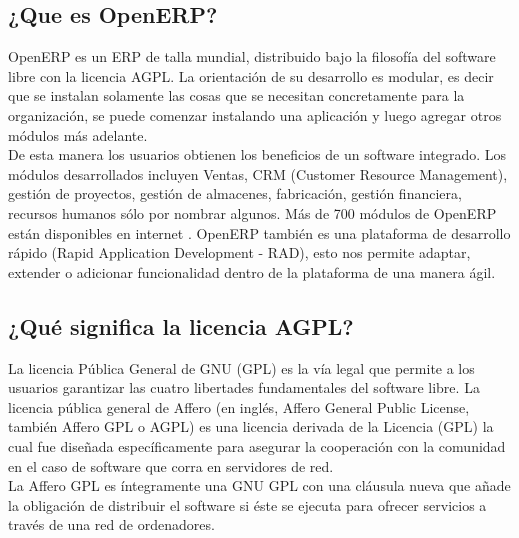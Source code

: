 \subsection{¿Que es OpenERP?}
OpenERP es un ERP de talla mundial, distribuido bajo la filosofía del software libre con la licencia AGPL.
La orientación de su desarrollo es modular, es decir que 
se instalan solamente las cosas que se necesitan concretamente para la organización, se puede comenzar instalando una aplicación y luego 
agregar otros módulos más adelante.\\
De esta manera los usuarios obtienen los beneficios de un software integrado. Los módulos desarrollados incluyen Ventas,
CRM (Customer Resource Management), gestión de proyectos, gestión de almacenes, fabricación, gestión financiera, recursos humanos sólo por nombrar algunos. 
Más de 700 módulos de OpenERP están disponibles en internet \cite{OpenERP}.
OpenERP también es una plataforma de desarrollo rápido (Rapid Application Development - RAD), esto nos permite adaptar, extender o adicionar funcionalidad dentro de la plataforma de una manera ágil.

\subsection{¿Qué significa la licencia AGPL?}
La licencia  Pública General de GNU (GPL) es la vía legal que permite a los usuarios garantizar las cuatro libertades fundamentales del software libre.
La licencia pública general de Affero (en inglés, Affero General Public License, también Affero GPL o AGPL) es una licencia 
derivada de la Licencia (GPL) la cual fue diseñada específicamente para asegurar la cooperación con la comunidad
en el caso de software que corra en servidores de red.\\
La Affero GPL es íntegramente una GNU GPL con una cláusula nueva que añade la obligación de distribuir el software si éste se 
ejecuta para ofrecer servicios a través de una red de ordenadores\cite{AGPLexp}.
